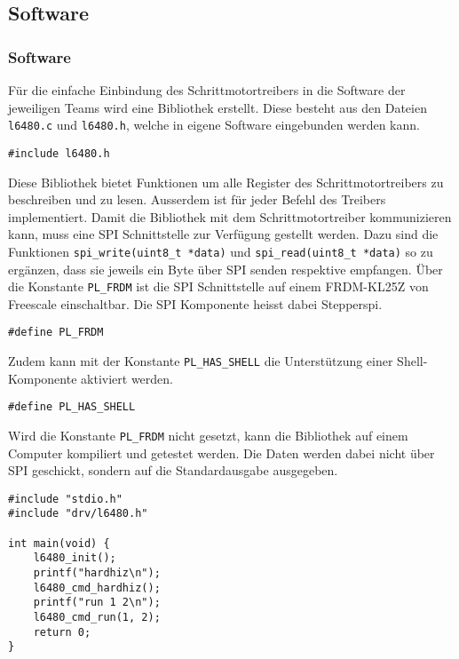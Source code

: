     \subsection{Software}   \label{ch:Software} 
    \fi
    \ifEMBED
    \subsubsection{Software} \label{ch:Software}
    \fi
    Für die einfache Einbindung des Schrittmotortreibers in die Software der 
    jeweiligen Teams wird eine Bibliothek erstellt. Diese besteht aus den 
    Dateien \verb?l6480.c? und \verb?l6480.h?, welche in eigene Software 
    eingebunden werden kann. 
    \begin{lstlisting}[caption={Einbinden der Bibliothek}]
#include l6480.h
    \end{lstlisting}
    Diese Bibliothek bietet Funktionen um alle Register des 
    Schrittmotortreibers zu beschreiben und zu lesen. Ausserdem ist für jeder 
    Befehl des Treibers implementiert. Damit die Bibliothek mit dem 
    Schrittmotortreiber kommunizieren kann, muss eine SPI Schnittstelle zur 
    Verfügung gestellt werden. Dazu sind die Funktionen 
    \verb?spi_write(uint8_t *data)? und \verb?spi_read(uint8_t *data)? so zu 
    ergänzen, dass sie jeweils ein Byte über SPI senden respektive empfangen. 
    Über die Konstante \verb?PL_FRDM? ist die SPI Schnittstelle auf einem 
    FRDM-KL25Z von Freescale einschaltbar. Die SPI Komponente heisst dabei 
    Stepperspi. 
    \begin{lstlisting}[caption={Definition der Plattform für das FRDM-KL25Z}]
#define PL_FRDM
    \end{lstlisting}
    Zudem kann mit der Konstante \verb?PL_HAS_SHELL?  die Unterstützung einer 
    Shell-Komponente aktiviert werden. 
    \begin{lstlisting}[caption={Definition für Shell-Unterstützung}]
#define PL_HAS_SHELL
    \end{lstlisting}
    Wird die Konstante \verb?PL_FRDM?  nicht gesetzt, kann die Bibliothek auf 
    einem Computer kompiliert und getestet werden. Die Daten werden dabei 
    nicht über SPI geschickt, sondern auf die Standardausgabe ausgegeben. 
    \begin{lstlisting}[caption={Beispielprogramm für den Test der Bibliothek auf dem Computer}, label={lis:test_source}]
#include "stdio.h"
#include "drv/l6480.h"

int main(void) {
    l6480_init();
    printf("hardhiz\n");
    l6480_cmd_hardhiz();
    printf("run 1 2\n");
    l6480_cmd_run(1, 2);
    return 0;
}
    \end{lstlisting}

